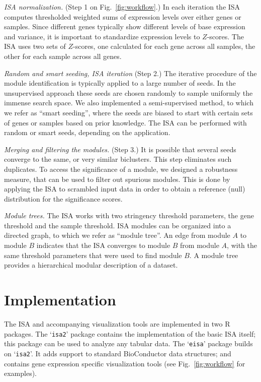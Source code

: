 \documentclass{bioinfo}
\newcommand{\Rpackage}[1]{`\texttt{#1}'}
\begin{document}
\emph{ISA normalization.} (Step 1 on Fig.~\ref{fig:workflow}.)
In each iteration the ISA computes thresholded weighted sums of expression
levels over either genes or samples. Since different genes 
typically show different levels of base
expression and variance, it is important to standardize expression
levels to $Z$-scores. The ISA uses two sets of $Z$-scores, one
calculated for each gene across all samples, the other for each sample
across all genes.

\emph{Random and smart seeding, ISA iteration} (Step 2.)
The iterative procedure of the module identification is typically applied to a
large number of seeds. In the unsupervised approach these seeds are chosen
randomly to sample uniformly the immense search space. We also implemented a
semi-supervised method, to which we refer as ``smart seeding'', where the
seeds are biased to start with certain sets of genes or samples based on
prior knowledge. The ISA can be performed with random or smart
seeds, depending on the application.

\emph{Merging and filtering the modules.} (Step 3.)
It is possible that several seeds converge to the same, or very similar
biclusters. This step eliminates such duplicates.
To access the significance of a module, we designed a robustness
measure, that can be used to filter out spurious modules. This is done
by applying the ISA to scrambled input data in order to obtain a
reference (null) distribution for the significance scores.

\emph{Module trees.}
The ISA works with two stringency threshold parameters, the gene
threshold and the sample threshold. ISA modules can be organized into
a directed graph, to which we refer as ``module tree''. An edge from module
$A$ to module $B$ indicates that the ISA converges to module $B$ from module $A$,
with the same threshold parameters that were used to find module
$B$. A module tree provides a hierarchical modular description of a
dataset.

\section{Implementation}%
\label{sec:implementation}

The ISA and accompanying visualization tools are implemented in two R
packages. The \Rpackage{isa2} package contains the implementation of
the basic ISA itself; this package can be used to analyze any tabular
data. The \Rpackage{eisa} package builds on \Rpackage{isa2}. It adds
support to standard BioConductor data structures; and
contains gene expression specific visualization tools (see
Fig.~\ref{fig:workflow} for examples).
\end{document}
